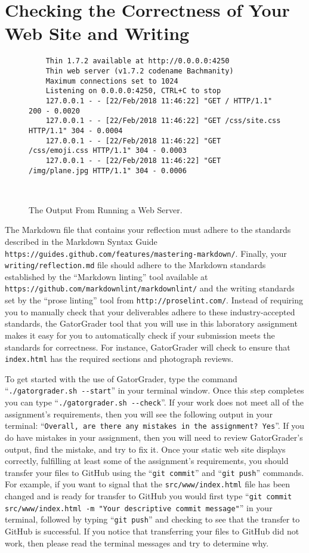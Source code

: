 \documentclass[11pt]{article}
\newcommand{\mainprogram}{\lstinline{index.html}}
\newcommand{\mainprogramsource}{\lstinline{src/www/index.html}}
\newcommand{\reflection}{\lstinline{writing/reflection.md}}
\newcommand{\gatorgraderstart}{\command{./gatorgrader.sh --start}}
\newcommand{\gatorgradercheck}{\command{./gatorgrader.sh --check}}
\newcommand{\gitcommit}{\command{git commit}}
\newcommand{\gitpush}{\command{git push}}
\newcommand{\gitcommitmainprogram}{\command{git commit src/www/index.html -m "Your
descriptive commit message"}}
\newcommand{\command}[1]{``\lstinline{#1}''}
\newcommand{\url}[1]{\lstinline{#1}}
\newcommand{\step}[1]{``{#1}''}
\begin{document}
\section*{Checking the Correctness of Your Web Site and Writing}

\begin{figure}[t]
  \centering
  \begin{verbatim}
    Thin 1.7.2 available at http://0.0.0.0:4250
    Thin web server (v1.7.2 codename Bachmanity)
    Maximum connections set to 1024
    Listening on 0.0.0.0:4250, CTRL+C to stop
    127.0.0.1 - - [22/Feb/2018 11:46:22] "GET / HTTP/1.1" 200 - 0.0020
    127.0.0.1 - - [22/Feb/2018 11:46:22] "GET /css/site.css HTTP/1.1" 304 - 0.0004
    127.0.0.1 - - [22/Feb/2018 11:46:22] "GET /css/emoji.css HTTP/1.1" 304 - 0.0003
    127.0.0.1 - - [22/Feb/2018 11:46:22] "GET /img/plane.jpg HTTP/1.1" 304 - 0.0006
  \end{verbatim}
  \vspace*{-.35in}
  \caption{The Output From Running a Web Server.}~\label{fig:output}
  \vspace*{-.25in}
\end{figure}

The Markdown file that contains your reflection must adhere to the standards
described in the Markdown Syntax Guide
\url{https://guides.github.com/features/mastering-markdown/}. Finally, your
\reflection{} file should adhere to the Markdown standards established by the
\step{Markdown linting} tool available at
\url{https://github.com/markdownlint/markdownlint/} and the writing standards
set by the \step{prose linting} tool from \url{http://proselint.com/}. Instead
of requiring you to manually check that your deliverables adhere to these
industry-accepted standards, the GatorGrader tool that you will use in this
laboratory assignment makes it easy for you to automatically check if your
submission meets the standards for correctness. For instance, GatorGrader will
check to ensure that \mainprogram{} has the required sections and photograph
reviews.

To get started with the use of GatorGrader, type the command \gatorgraderstart{}
in your terminal window. Once this step completes you can type
\gatorgradercheck{}. If your work does not meet all of the assignment's
requirements, then you will see the following output in your terminal:
\command{Overall, are there any mistakes in the assignment? Yes}. If you do have
mistakes in your assignment, then you will need to review GatorGrader's output,
find the mistake, and try to fix it. Once your static web site displays
correctly, fulfilling at least some of the assignment's requirements, you should
transfer your files to GitHub using the \gitcommit{} and \gitpush{} commands.
For example, if you want to signal that the \mainprogramsource{} file has been
changed and is ready for transfer to GitHub you would first type
\gitcommitmainprogram{} in your terminal, followed by typing \gitpush{} and
checking to see that the transfer to GitHub is successful. If you notice that
transferring your files to GitHub did not work, then please read the terminal
messages and try to determine why.
\end{document}

